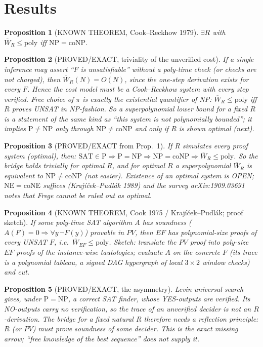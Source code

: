 \documentclass{article}
\newtheorem{prop}{Proposition}
\begin{document}
\section{Results}
\begin{prop}[KNOWN THEOREM, Cook--Reckhow 1979] $\exists R$ with $\overline W_R\le\mathrm{poly}$ iff $\mathrm{NP}=\mathrm{coNP}$.\end{prop}
\begin{prop}[PROVED/EXACT, triviality of the unverified cost] If a single inference may assert ``$F$ is unsatisfiable'' without a poly-time check (or checks are not charged), then $\overline W_R(N)=O(N)$, since the one-step derivation exists for every $F$. Hence the cost model must be a Cook--Reckhow system with every step verified. Free choice of $\pi$ is exactly the existential quantifier of NP: $\overline W_R\le\mathrm{poly}$ iff $R$ proves UNSAT in NP-fashion. So a superpolynomial lower bound for a fixed $R$ is a statement of the same kind as ``this system is not polynomially bounded''; it implies $\mathrm P\ne\mathrm{NP}$ only through $\mathrm{NP}\ne\mathrm{coNP}$ and only if $R$ is shown optimal (next).\end{prop}
\begin{prop}[PROVED/EXACT from Prop.~1] If $R$ simulates every proof system (optimal), then: $\mathrm{SAT}\in\mathrm P\Rightarrow\mathrm P=\mathrm{NP}\Rightarrow\mathrm{NP}=\mathrm{coNP}\Rightarrow\overline W_R\le\mathrm{poly}$. So the bridge holds trivially for optimal $R$, and for optimal $R$ a superpolynomial $\overline W_R$ is \emph{equivalent} to $\mathrm{NP}\ne\mathrm{coNP}$ (not easier). Existence of an optimal system is OPEN; $\mathrm{NE}=\mathrm{coNE}$ suffices (Krajíček--Pudlák 1989) and the survey arXiv:1909.03691 notes that Frege cannot be ruled out as optimal.\end{prop}
\begin{prop}[KNOWN THEOREM, Cook 1975 / Krajíček--Pudlák; proof sketch] If some poly-time SAT algorithm $A$ has soundness ($A(F)=0\Rightarrow\forall y\,\neg F(y)$) provable in $PV$, then $EF$ has polynomial-size proofs of every UNSAT $F$, i.e.\ $\overline W_{EF}\le\mathrm{poly}$. Sketch: translate the $PV$ proof into poly-size $EF$ proofs of the instance-wise tautologies; evaluate $A$ on the concrete $F$ (its trace is a polynomial tableau, a signed DAG hypergraph of local $3\times2$ window checks) and cut.\end{prop}
\begin{prop}[PROVED/EXACT, the asymmetry] Levin universal search gives, under $\mathrm P=\mathrm{NP}$, a correct SAT \emph{finder}, whose YES-outputs are verified. Its NO-outputs carry no verification, so the trace of an unverified decider is not an $R$-derivation. The bridge for a fixed natural $R$ therefore needs a reflection principle: $R$ (or $PV$) must prove soundness of some decider. This is the exact missing arrow; ``free knowledge of the best sequence'' does not supply it.\end{prop}
\end{document}
